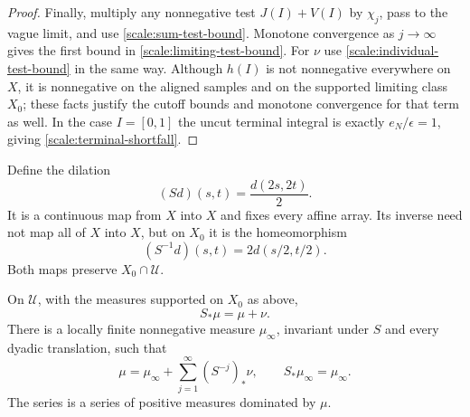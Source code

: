 \begin{proof}
Finally, multiply any nonnegative test $J(I)+V(I)$ by $\chi_j$,
pass to the vague limit, and use
\cref{scale:sum-test-bound}. Monotone convergence as $j\to\infty$
gives the first bound in \cref{scale:limiting-test-bound}. For $\nu$
use \cref{scale:individual-test-bound} in the same way. Although
$h(I)$ is not nonnegative everywhere on $X$, it is nonnegative on
the aligned samples and on the supported limiting class $X_0$;
these facts justify the cutoff bounds and monotone convergence for
that term as well. In the case $I=[0,1]$ the uncut terminal
integral is exactly $e_N/\epsilon=1$, giving
\cref{scale:terminal-shortfall}.
\end{proof}

Define the dilation
\begin{equation}\label{scale:dilation}
 (Sd)(s,t)=\frac{d(2s,2t)}2.
\end{equation}
It is a continuous map from $X$ into $X$ and fixes every affine
array. Its inverse need not map all of $X$ into $X$, but on $X_0$
it is the homeomorphism
\[
 (S^{-1}d)(s,t)=2d(s/2,t/2).
\]
Both maps preserve $X_0\cap\mathcal U$.

\begin{proposition}\label{scale:decomposition}
On $\mathcal U$, with the measures supported on $X_0$ as above,
\begin{equation}\label{scale:measure-balance}
 S_*\mu=\mu+\nu.
\end{equation}
There is a locally finite nonnegative measure $\mu_\infty$, invariant
under $S$ and every dyadic translation, such that
\begin{equation}\label{scale:measure-decomposition}
 \mu=\mu_\infty+\sum_{j=1}^{\infty}(S^{-j})_*\nu,
 \qquad S_*\mu_\infty=\mu_\infty.
\end{equation}
The series is a series of positive measures dominated by $\mu$.
\end{proposition}

